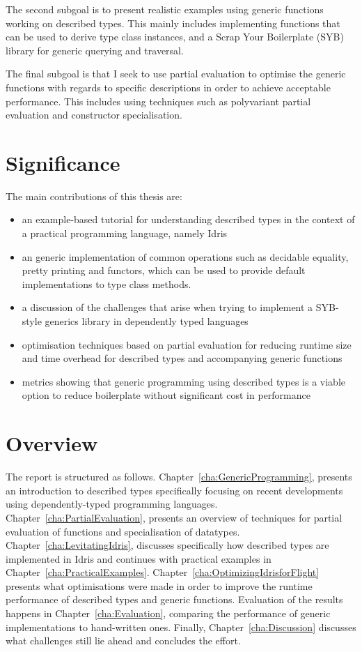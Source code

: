 \documentclass{ituthesis}
\theoremstyle{definition}
\begin{document}
The second subgoal is to present realistic examples using generic functions working on described types. 
This mainly includes implementing functions that can be used to derive type class instances, and a Scrap Your Boilerplate (SYB) library for generic querying and traversal.

The final subgoal is that I seek to use partial evaluation to optimise the generic functions with regards to specific descriptions in order to achieve acceptable performance.
This includes using techniques such as polyvariant partial evaluation and constructor specialisation. %

\section{Significance}
\label{sec:Significance}
The main contributions of this thesis are:

\begin{itemize}
  \item an example-based tutorial for understanding described types in the context of a practical programming language, namely Idris
  \item an generic implementation of common operations such as decidable equality, pretty printing and functors, which can be used to provide default implementations to type class methods.
  \item a discussion of the challenges that arise when trying to implement a SYB-style generics library in dependently typed languages
  \item optimisation techniques based on partial evaluation for reducing runtime size and time overhead for described types and accompanying generic functions
  \item metrics showing that generic programming using described types is a viable option to reduce boilerplate without significant cost in performance
\end{itemize}
\section{Overview}
\label{sec:Overview}

The report is structured as follows. Chapter~\ref{cha:GenericProgramming}, presents an introduction to described types specifically focusing on recent developments using dependently-typed programming languages.
Chapter~\ref{cha:PartialEvaluation}, presents an overview of techniques for partial evaluation of functions and specialisation of datatypes. Chapter~\ref{cha:LevitatingIdris}, discusses specifically how described types are implemented in Idris and continues with practical examples in Chapter~\ref{cha:PracticalExamples}.
Chapter~\ref{cha:OptimizingIdrisforFlight} presents what optimisations were made in order to improve the runtime performance of described types and generic functions. Evaluation of the results happens in Chapter~\ref{cha:Evaluation}, comparing the performance of generic implementations to hand-written ones.
Finally, Chapter~\ref{cha:Discussion} discusses what challenges still lie ahead and concludes the effort.
\end{document}
